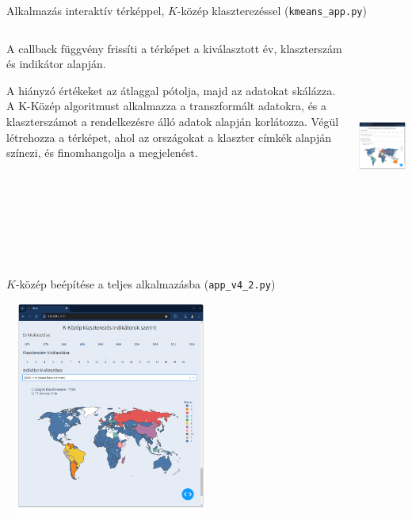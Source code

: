 \documentclass[english, aspectratio=169]{beamer}
\begin{document}
\begin{frame}{Alkalmazás interaktív térképpel, $K$-közép klaszterezéssel (\texttt{kmeans\_app.py})}
	\begin{columns}
		\begin{column}{.5\textwidth}
			A callback függvény frissíti a térképet a kiválasztott év, klaszterszám és indikátor alapján.\par\smallskip
			A hiányzó értékeket az átlaggal pótolja, majd az adatokat skálázza. A K-Közép algoritmust alkalmazza a transzformált adatokra, és a klaszterszámot a rendelkezésre álló adatok alapján korlátozza. Végül létrehozza a térképet, ahol az országokat a klaszter címkék alapján színezi, és finomhangolja a megjelenést.
		\end{column}
		\begin{column}{.5\textwidth}
			\begin{center}
				\includegraphics[width=7cm, height=7cm, keepaspectratio]{images/freq_19.png}
			\end{center}
		\end{column}
	\end{columns}
\end{frame}

\begin{frame}{$K$-közép beépítése a teljes alkalmazásba (\texttt{app\_v4\_2.py})}
	\begin{center}
		\includegraphics[width=7cm, height=7cm, keepaspectratio]{images/freq_20.png}
	\end{center}
\end{frame}
\end{document}
